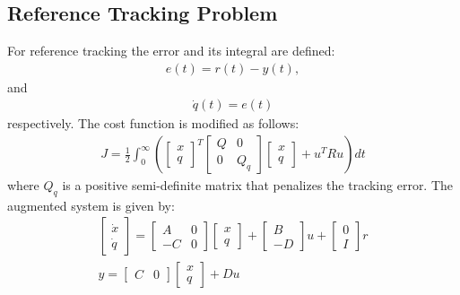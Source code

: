 \subsection*{Reference Tracking Problem}
For reference tracking the error and its integral are defined:
\begin{align*}
e(t) = r(t) - y(t),
\end{align*}
and
\begin{align*}
\dot{q}(t)= e(t)
\end{align*}
respectively. The cost function is modified as follows:
\begin{align*}
J=\frac{1}{2}\int_{0}^{\infty} \left(\begin{bmatrix}x\\q
\end{bmatrix}^T\begin{bmatrix}Q & 0\\0 & Q_q
\end{bmatrix}\begin{bmatrix}x\\q
\end{bmatrix} + u^T R u \right) dt
\end{align*}
where \( Q_q \) is a positive semi-definite matrix that penalizes the tracking error. The augmented system is given by:
\begin{align*}
\begin{bmatrix}\dot{x}\\\dot{q}
\end{bmatrix}=\begin{bmatrix}A & 0\\-C & 0
\end{bmatrix}\begin{bmatrix}x\\q
\end{bmatrix}+\begin{bmatrix}B\\-D
\end{bmatrix}u+\begin{bmatrix}0\\I
\end{bmatrix}r\\
y=\begin{bmatrix}C & 0\end{bmatrix}\begin{bmatrix}x\\q
\end{bmatrix}+Du
\end{align*}